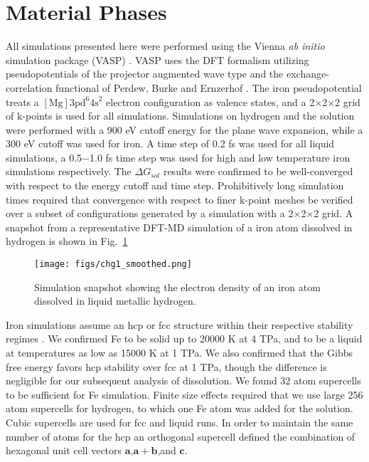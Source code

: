 \section{Material Phases}


All simulations presented here were performed using the Vienna {\it ab initio}
simulation package (VASP) \citep{kresse96}. VASP uses the DFT formalism utilizing
pseudopotentials of the projector augmented wave type \citep{blochl94} and the exchange-correlation
functional of Perdew, Burke and Ernzerhof \citep{perdew96}. The iron
pseudopotential treats a $[\mathrm{Mg}]\mathrm{3pd}^6\mathrm{4s}^2$ electron
configuration as valence states, and a 2$\times$2$\times$2
grid of k-points is used for all simulations. Simulations on hydrogen 
and the solution were performed with a 900 eV cutoff energy for the plane wave expansion, while a 300
eV cutoff was used for iron. A time step of 0.2 fs was used for all liquid simulations, a
0.5$-$1.0 fs time step  was used for high and low temperature iron simulations 
respectively. The $\Delta G_{sol}$ results were confirmed to be well-converged
with respect to the energy cutoff and time step. 
Prohibitively long simulation times required that convergence with respect to
finer k-point meshes be verified over a subset of configurations generated by
a simulation with a 2$\times$2$\times$2 grid. A snapshot from a representative DFT-MD simulation of a iron atom dissolved in hydrogen is shown in Fig.~\ref{fig:HFe_snap}

\begin{figure}[!h] %
   \centering
   \texttt{[image: figs/chg1\_smoothed.png]} 
\caption{ Simulation snapshot showing the electron density of an iron atom dissolved in liquid
    metallic hydrogen.\label{fig:HFe_snap}}
\end{figure}

Iron simulations assume an hcp or fcc structure within their respective
stability regimes \citep{pickard09,stixrude12}. We confirmed Fe to be solid up
to 20000 K at 4 TPa, and to be a liquid at temperatures as low as 15000 K at
1 TPa. We also confirmed that the Gibbs free energy favors hcp stability over fcc
at 1 TPa, though the difference is negligible for our subsequent analysis of
dissolution. We found 32 atom supercells to be sufficient for Fe simulation.
Finite size effects required that we use large 256 atom supercells for
hydrogen, to which one Fe atom was added for the solution. Cubic
supercells are used for fcc and liquid runs. In order to maintain the same
number of atoms for the hcp an orthogonal supercell defined the combination of
hexagonal unit cell vectors $\mathbf{a}$,$\mathbf{a}+\mathbf{b}$,and
$\mathbf{c}$.


